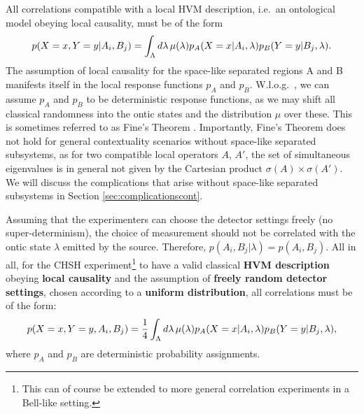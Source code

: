 All correlations compatible with a local HVM description, i.e.\ an ontological model obeying local causality, must be of the form
\begin{equation*}
p(X=x,Y=y\vert A_i,B_j)=\int_{\Lambda}d\lambda\thinspace\mu(\lambda)p_{A}(X=x\vert A_i, \lambda)p_{B}(Y=y\vert B_j, \lambda).
\end{equation*}
The assumption of local causality for the space-like separated regions A and B manifests itself in the local response functions $p_A$ and $p_B$. W.l.o.g.\ , we can assume $p_A$ and $p_B$ to be deterministic response functions, as we may shift all classical randomness into the ontic states and the distribution $\mu$ over these. This is sometimes referred to as Fine's Theorem \cite{Fine1982}. Importantly, Fine's Theorem does not hold for general contextuality scenarios without space-like separated subsystems, as for two compatible local operators $A$, $A'$, the set of simultaneous eigenvalues is in general not given by the Cartesian product $\sigma(A)\times\sigma(A')$. We will discuss the complications that arise without space-like separated subsystems in Section \ref{sec:complicationscont}.

Assuming that the experimenters can choose the detector settings freely (no super-determinism), the choice of measurement should not be correlated with the ontic state $\lambda$ emitted by the source. Therefore, $p(A_i,B_j\vert \lambda)=p(A_i,B_j)$. All in all, for the CHSH experiment\footnote{This can of course be extended to more general correlation experiments in a Bell-like setting.} to have a valid classical \textbf{HVM description} obeying \textbf{local causality} and the assumption of \textbf{freely random detector settings}, chosen according to a \textbf{uniform distribution}, all correlations must be of the form:
\begin{equation}
\label{eqn:lhvm}
p(X=x,Y=y,A_i,B_j)=\frac{1}{4}\int_{\Lambda}d\lambda\thinspace\mu(\lambda)p_{A}(X=x\vert A_i, \lambda)p_{B}(Y=y\vert B_j, \lambda),
\end{equation}
where $p_A$ and $p_B$ are deterministic probability assignments.

